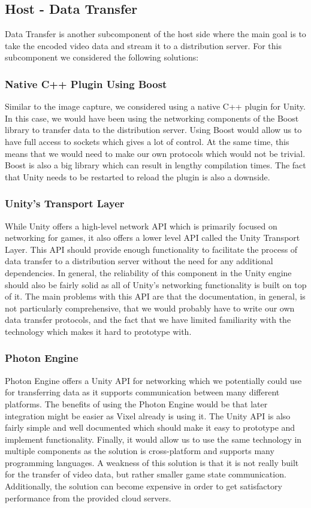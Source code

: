 \subsection{Host - Data Transfer} 
Data Transfer is another subcomponent of the host side where the main goal is to take the encoded video data and stream it to a distribution server. For this subcomponent we considered the following solutions:

\subsubsection{Native C++ Plugin Using Boost}
Similar to the image capture, we considered using a native C++ plugin for Unity. In this case, we would have been using the networking components of the Boost library\cite{boost} to transfer data to the distribution server. Using Boost would allow us to have full access to sockets which gives a lot of control. At the same time, this means that we would need to make our own protocols which would not be trivial. Boost is also a big library which can result in lengthy compilation times. The fact that Unity needs to be restarted to reload the plugin is also a downside. 

\subsubsection{Unity's Transport Layer}
While Unity offers a high-level network API which is primarily focused on networking for games, it also offers a lower level API called the Unity Transport Layer\cite{unity_transportLayer}. This API should provide enough functionality to facilitate the process of data transfer to a distribution server without the need for any additional dependencies. In general, the reliability of this component in the Unity engine should also be fairly solid as all of Unity's networking functionality is built on top of it. The main problems with this API are that the documentation, in general, is not particularly comprehensive, that we would probably have to write our own data transfer protocols, and the fact that we have limited familiarity with the technology which makes it hard to prototype with. 

\subsubsection{Photon Engine}
Photon Engine\cite{photon_homepage} offers a Unity API for networking which we potentially could use for transferring data as it supports communication between many different platforms. The benefits of using the Photon Engine would be that later integration might be easier as Vixel already is using it. The Unity API is also fairly simple and well documented which should make it easy to prototype and implement functionality.
Finally, it would allow us to use the same technology in multiple components as the solution is cross-platform and supports many programming languages. A weakness of this solution is that it is not really built for the transfer of video data, but rather smaller game state communication. Additionally, the solution can become expensive in order to get satisfactory performance from the provided cloud servers.  

